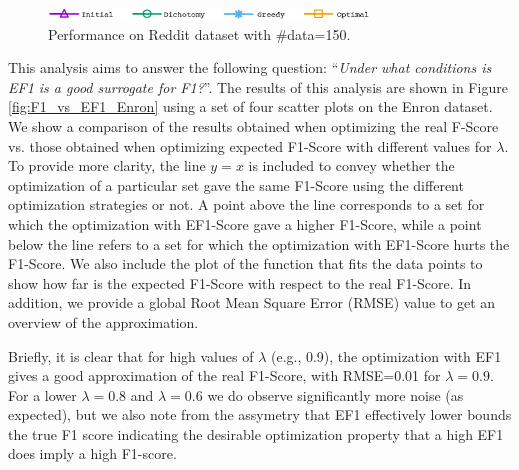 \begin{figure}[H]
\begin{centering}
\includegraphics[width=8.5cm]{imgs/legend1}
\par\end{centering}
\begin{centering}
\par\end{centering}
\caption{Performance on Reddit dataset with \#data=150.}
\label{fig:F1_vs_Pos_Reddit}
\end{figure}

 This analysis aims to answer the following question: \textquotedblleft \textit{Under what conditions is EF1 is a good surrogate for F1?}\textquotedblright{}. The results of this analysis are shown in Figure \ref{fig:F1_vs_EF1_Enron} using a set of four scatter plots on the Enron dataset.
We show a comparison of the results obtained when optimizing the real F-Score vs. those obtained when optimizing expected F1-Score with different values for $\lambda$.
To provide more clarity, the line $y = x$ is included to convey whether the optimization of a particular set gave the same F1-Score using the different optimization strategies or not. A point above the line corresponds to a set for which the optimization with EF1-Score gave a higher F1-Score, while a point below the line refers to a set for which the optimization with EF1-Score  hurts the F1-Score. We also include the plot of the function that fits the data points to show how far is the expected F1-Score with respect to the real F1-Score. In addition, we provide a global Root Mean Square Error (RMSE) value to get an overview of the approximation.

Briefly, it is clear that for high values of $\lambda$ (e.g., 0.9), the optimization with EF1 gives a good approximation of the real F1-Score, with RMSE=0.01 for $\lambda=0.9$. For a lower $\lambda=0.8$ and $\lambda=0.6$ we do observe significantly more noise (as expected), but we also note from the assymetry that EF1 effectively lower bounds the true F1 score indicating the desirable optimization property that a high EF1 does imply a high F1-score.

